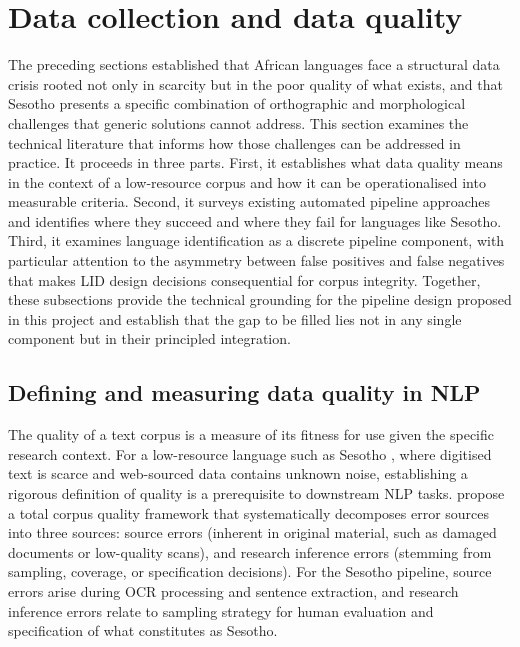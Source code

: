 \documentclass[11pt,a4paper]{article}
\begin{document}
\section{Data collection and data quality}
The preceding sections established that African languages face a structural data crisis rooted not only in scarcity but in the poor quality of what exists, and that Sesotho presents a specific combination of orthographic and morphological challenges that generic solutions cannot address. This section examines the technical literature that informs how those challenges can be addressed in practice. It proceeds in three parts. First, it establishes what data quality means in the context of a low-resource corpus and how it can be operationalised into measurable criteria. Second, it surveys existing automated pipeline approaches and identifies where they succeed and where they fail for languages like Sesotho. Third, it examines language identification as a discrete pipeline component, with particular attention to the asymmetry between false positives and false negatives that makes LID design decisions consequential for corpus integrity. Together, these subsections provide the technical grounding for the pipeline design proposed in this project and establish that the gap to be filled lies not in any single component but in their principled integration.
\subsection{Defining and measuring data quality in NLP}
The quality of a text corpus is a measure of its fitness for use given the specific research context. For a low-resource language such as Sesotho , where digitised text is scarce and web-sourced data contains unknown noise, establishing a rigorous definition of quality is a prerequisite to downstream NLP tasks. \citet{hurtado2022documents} propose a total corpus quality framework that systematically decomposes error sources into three sources: source errors (inherent in original material, such as damaged documents or low-quality scans), and research inference errors (stemming from sampling, coverage, or specification decisions). For the Sesotho pipeline, source errors arise during OCR processing and sentence extraction, and research inference errors relate to sampling strategy for human evaluation and specification of what constitutes as Sesotho.
\end{document}

